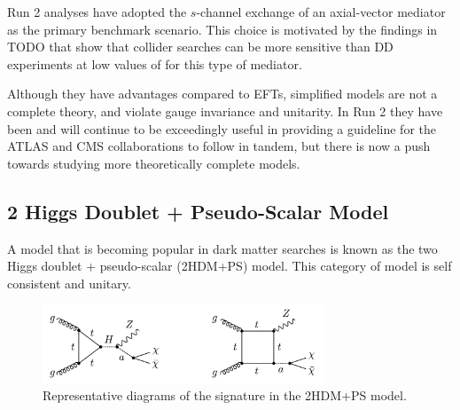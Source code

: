 


Run 2 analyses have adopted the $s$-channel exchange of an axial-vector mediator as the primary benchmark scenario. This choice is motivated by the findings in TODO that show that collider searches can be more sensitive than DD experiments at low values of \mchi for this type of mediator. 

Although they have advantages compared to EFTs, simplified models are not a complete theory, and violate gauge invariance and unitarity. In Run 2 they have been and will continue to be exceedingly useful in providing a guideline for the ATLAS and CMS collaborations to follow in tandem, but there is now a push towards studying more theoretically complete models.

\subsection{2 Higgs Doublet + Pseudo-Scalar Model}

A model that is becoming popular in \monoX dark matter searches is known as the two Higgs doublet + pseudo-scalar (2HDM+PS) model. This category of model is self consistent and unitary.

\begin{figure}[htb]
\centering
\includegraphics[width=0.75\textwidth]{Figures/2hdma.png}
\caption{Representative diagrams of the \monoZ signature in the 2HDM+PS model.}
\label{fig:2hdma}
\end{figure}

